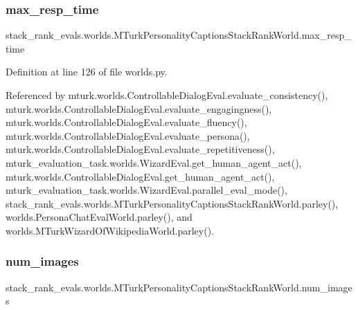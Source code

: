 \subsubsection{\texorpdfstring{max\+\_\+resp\+\_\+time}{max\_resp\_time}}
{\footnotesize\ttfamily stack\+\_\+rank\+\_\+evals.\+worlds.\+M\+Turk\+Personality\+Captions\+Stack\+Rank\+World.\+max\+\_\+resp\+\_\+time}



Definition at line 126 of file worlds.\+py.



Referenced by mturk.\+worlds.\+Controllable\+Dialog\+Eval.\+evaluate\+\_\+consistency(), mturk.\+worlds.\+Controllable\+Dialog\+Eval.\+evaluate\+\_\+engagingness(), mturk.\+worlds.\+Controllable\+Dialog\+Eval.\+evaluate\+\_\+fluency(), mturk.\+worlds.\+Controllable\+Dialog\+Eval.\+evaluate\+\_\+persona(), mturk.\+worlds.\+Controllable\+Dialog\+Eval.\+evaluate\+\_\+repetitiveness(), mturk\+\_\+evaluation\+\_\+task.\+worlds.\+Wizard\+Eval.\+get\+\_\+human\+\_\+agent\+\_\+act(), mturk.\+worlds.\+Controllable\+Dialog\+Eval.\+get\+\_\+human\+\_\+agent\+\_\+act(), mturk\+\_\+evaluation\+\_\+task.\+worlds.\+Wizard\+Eval.\+parallel\+\_\+eval\+\_\+mode(), stack\+\_\+rank\+\_\+evals.\+worlds.\+M\+Turk\+Personality\+Captions\+Stack\+Rank\+World.\+parley(), worlds.\+Persona\+Chat\+Eval\+World.\+parley(), and worlds.\+M\+Turk\+Wizard\+Of\+Wikipedia\+World.\+parley().

\mbox{\label{classstack__rank__evals_1_1worlds_1_1MTurkPersonalityCaptionsStackRankWorld_a7ea4232327466929526fd93f4e9fe679}} 
\subsubsection{\texorpdfstring{num\+\_\+images}{num\_images}}
{\footnotesize\ttfamily stack\+\_\+rank\+\_\+evals.\+worlds.\+M\+Turk\+Personality\+Captions\+Stack\+Rank\+World.\+num\+\_\+images}



